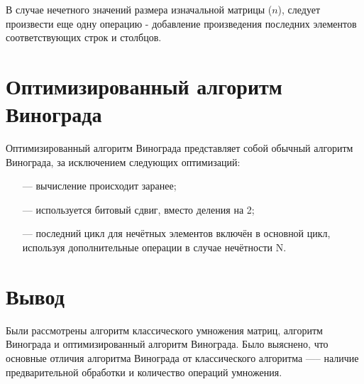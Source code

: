 В случае нечетного значений размера изначальной матрицы ($n$), следует произвести еще одну операцию - добавление произведения последних элементов соответствующих строк и столбцов.

\section{Оптимизированный алгоритм Винограда}

Оптимизированный алгоритм Винограда представляет собой обычный алгоритм Винограда, за исключением следующих оптимизаций:
\begin{itemize}
	\item[---] вычисление происходит заранее;
	\item[---] используется битовый сдвиг, вместо деления на 2;
	\item[---] последний цикл для нечётных элементов включён в основной цикл,
	используя дополнительные операции в случае нечётности N.
\end{itemize}


\section*{Вывод}
Были рассмотрены алгоритм классического умножения матриц, алгоритм Винограда и оптимизированный алгоритм Винограда. Было выяснено, что основные отличия алгоритма Винограда от классического алгоритма —-- наличие предварительной обработки и количество операций умножения.



